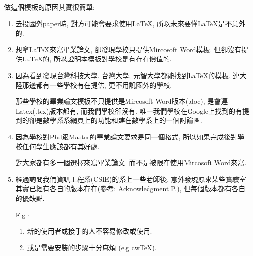 

做這個模板的原因其實很簡單:

\begin{enumerate}
  \item
  {
    去投國外paper時, 對方可能會要求使用LaTeX, 所以未來要懂LaTeX是不意外的.
  } %

  \item
  {
    想拿LaTeX來寫畢業論文, 卻發現學校只提供Mircosoft Word模板, 但卻沒有提供LaTeX的, 所以證明本模板對學校是有存在價值的.
  } %

  \item
  {
    因為看到發現台灣科技大學, 台灣大學, 元智大學都能找到LaTeX的模板, 連大陸那邊都有一些學校有在提供, 更不用說國外的學校.

    那些學校的畢業論文模板不只提供是Mircosoft Word版本(.doc), 是會連Latex(.tex)版本都有, 而我們學校卻沒有. 唯一我們學校在Google上找到的有提到的卻是數學系系網頁上的功能和建在數學系上的一個討論區.
  } %

  \item
  {
    因為學校對Phd跟Master的畢業論文要求是同一個格式, 所以如果完成後對學校任何學生應該都有其好處.

    對大家都有多一個選擇來寫畢業論文, 而不是被限在使用Mircosoft Word來寫.
  } %

  \item
  {
    經過詢問我們資訊工程系(CSIE)的系上一些老師後, 意外發現原來某些實驗室其實已經有各自的版本存在(參考: Acknowledgment P.), 但每個版本都有各自的優缺點.

    E.g :
    \begin{enumerate}

      \item
      {
        新的使用者或接手的人不容易修改或使用.
      } %

      \item
      {
        或是需要安裝的步驟十分麻煩 (e.g cwTeX).
      } %


\end{enumerate}}
\end{enumerate}
